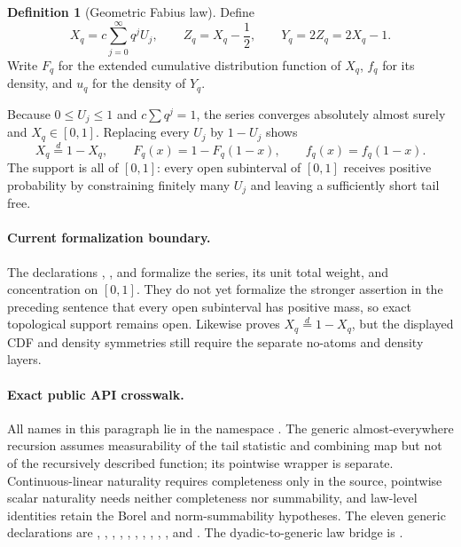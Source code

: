 \documentclass[11pt,oneside]{article}
\theoremstyle{definition}
\newtheorem{definition}[theorem]{Definition}
\theoremstyle{remark}
\begin{document}
\begin{definition}[Geometric Fabius law]
\label{def:qfabius}
Define
\begin{equation}
 X_q=c\sum_{j=0}^{\infty}q^jU_j,
 \qquad
 Z_q=X_q-\frac12,
 \qquad
 Y_q=2Z_q=2X_q-1.                         \label{eq:q-law}
\end{equation}
Write $F_q$ for the extended cumulative distribution function of $X_q$,
$f_q$ for its density, and $u_q$ for the density of $Y_q$.
\end{definition}

Because $0\le U_j\le1$ and $c\sum q^j=1$, the series converges absolutely almost surely and
$X_q\in[0,1]$.  Replacing every $U_j$ by $1-U_j$ shows
\begin{equation}
 X_q\overset d=1-X_q,
 \qquad F_q(x)=1-F_q(1-x),
 \qquad f_q(x)=f_q(1-x).                   \label{eq:symmetry}
\end{equation}
The support is all of $[0,1]$: every open subinterval of $[0,1]$ receives positive
probability by constraining finitely many $U_j$ and leaving a sufficiently short tail free.

\paragraph{Current formalization boundary.}
The declarations ,
, and
 formalize the series, its unit total weight, and
concentration on $[0,1]$.  They do not yet formalize the stronger assertion in the preceding
sentence that every open subinterval has positive mass, so exact topological support remains
open.  Likewise  proves
$X_q\overset d=1-X_q$, but the displayed CDF and density symmetries still require the
separate no-atoms and density layers.

\paragraph{Exact public API crosswalk.}
All names in this paragraph lie in the namespace
.  The generic almost-everywhere recursion assumes
measurability of the tail statistic and combining map but not of the recursively described
function; its pointwise wrapper is separate.  Continuous-linear naturality requires
completeness only in the source, pointwise scalar naturality needs neither completeness nor
summability, and law-level identities retain the Borel and norm-summability hypotheses.
The eleven generic declarations are
,
,
,
,
,
,
,
,
,
, and
.
The dyadic-to-generic law bridge is
.
\end{document}
